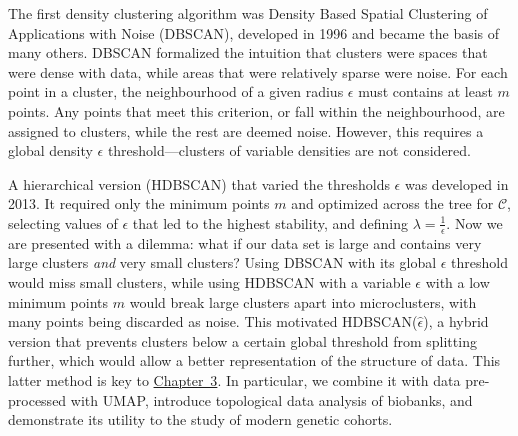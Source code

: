 The first density clustering algorithm was Density Based Spatial Clustering of Applications with Noise (DBSCAN), developed in 1996\citep{ester1996density} and became the basis of many others\citep{khan_dbscan_2014}. DBSCAN formalized the intuition that clusters were spaces that were dense with data, while areas that were relatively sparse were noise. For each point in a cluster, the neighbourhood of a given radius $\epsilon$ must contains at least $m$ points. Any points that meet this criterion, or fall within the neighbourhood, are assigned to clusters, while the rest are deemed noise. However, this requires a global density $\epsilon$ threshold---clusters of variable densities are not considered. 

A hierarchical version (HDBSCAN) that varied the thresholds $\epsilon$ was developed in 2013\citep{campello_density-based_2013}. It required only the minimum points $m$ and optimized across the tree for $\mathcal{C}$, selecting values of $\epsilon$ that led to the highest stability, and defining $\lambda = \frac{1}{\epsilon}$. Now we are presented with a dilemma: what if our data set is large and contains very large clusters \emph{and} very small clusters? Using DBSCAN with its global $\epsilon$ threshold would miss small clusters, while using HDBSCAN with a variable $\epsilon$ with a low minimum points $m$ would break large clusters apart into microclusters, with many points being discarded as noise. This motivated HDBSCAN($\hat{\epsilon}$), a hybrid version that prevents clusters below a certain global threshold from splitting further, which would allow a better representation of the structure of data\citep{malzer_hybrid_2020}. This latter method is key to \hyperref[chap:chapter3]{Chapter~3}. In particular, we combine it with data pre-processed with UMAP, introduce topological data analysis of biobanks, and demonstrate its utility to the study of modern genetic cohorts.




